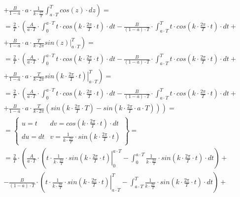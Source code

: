 \begin{task}
\begin{align*}
&+\left. \frac{B}{1-a}\cdot a \cdot \frac{1}{k \cdot \frac{2\pi}{T}} \int_{a \cdot T}^{T} cos\left(z\right) \cdot dz\right)=\\
&=\frac{2}{T}\cdot\left( \frac{A}{a \cdot T} \cdot \int_{0}^{a\cdot T} t \cdot cos\left( k \cdot \frac{2\pi}{T} \cdot t\right) \cdot dt -\frac{B}{\left(1-a\right)\cdot T}\cdot \int_{a \cdot T}^{T} t \cdot cos\left( k \cdot \frac{2\pi}{T} \cdot t\right) \cdot dt \right. +\\
&+\left. \frac{B}{1-a}\cdot a \cdot \frac{T}{k \cdot 2\pi} \left. sin\left(z\right) \right|_{a \cdot T}^{T}\right)=\\
&=\frac{2}{T}\cdot\left( \frac{A}{a \cdot T} \cdot \int_{0}^{a\cdot T} t \cdot cos\left( k \cdot \frac{2\pi}{T} \cdot t\right) \cdot dt -\frac{B}{\left(1-a\right)\cdot T}\cdot \int_{a \cdot T}^{T} t \cdot cos\left( k \cdot \frac{2\pi}{T} \cdot t\right) \cdot dt \right. +\\
&+\left. \frac{B}{1-a}\cdot a \cdot \frac{T}{k \cdot 2\pi} \left. sin\left(k \cdot \frac{2\pi}{T} \cdot t\right) \right|_{a \cdot T}^{T}\right)=\\
&=\frac{2}{T}\cdot\left( \frac{A}{a \cdot T} \cdot \int_{0}^{a\cdot T} t \cdot cos\left( k \cdot \frac{2\pi}{T} \cdot t\right) \cdot dt -\frac{B}{\left(1-a\right)\cdot T}\cdot \int_{a \cdot T}^{T} t \cdot cos\left( k \cdot \frac{2\pi}{T} \cdot t\right) \cdot dt \right. +\\
&+\left. \frac{B}{1-a}\cdot a \cdot \frac{T}{k \cdot 2\pi} \left( sin\left(k \cdot \frac{2\pi}{T} \cdot T\right) - sin\left(k \cdot \frac{2\pi}{T} \cdot a \cdot T\right) \right)\right)=\\
&=\left\{\begin{array}{ll}
u = t & dv = cos\left( k \cdot \frac{2\pi}{T} \cdot t\right) \cdot dt \\
du = dt & v = \frac{1}{k \cdot \frac{2\pi}{T}} \cdot sin\left( k \cdot \frac{2\pi}{T} \cdot t\right)
\end{array}\right\}=\\
&=\frac{2}{T}\cdot\left( \frac{A}{a \cdot T} \cdot \left( \left. t \cdot \frac{1}{k \cdot \frac{2\pi}{T}} \cdot sin\left( k \cdot \frac{2\pi}{T} \cdot t\right)
\right|_{0}^{a\cdot T} - \int_{0}^{a\cdot T} \frac{1}{k \cdot \frac{2\pi}{T}} \cdot sin\left( k \cdot \frac{2\pi}{T} \cdot t\right) \cdot dt\right) \right. + \\
&-\left.\frac{B}{\left(1-a\right)\cdot T}\cdot \left( \left. t \cdot \frac{1}{k \cdot \frac{2\pi}{T}} \cdot sin\left( k \cdot \frac{2\pi}{T} \cdot t\right) \right|_{a \cdot T}^{T} - \int_{a \cdot T}^{T}  \frac{1}{k \cdot \frac{2\pi}{T}} \cdot sin\left( k \cdot \frac{2\pi}{T} \cdot t\right) \cdot dt \right)\right. +\\

\end{align*}
\end{task}
